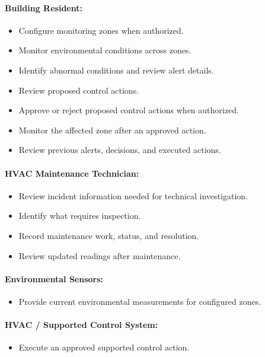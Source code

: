 \documentclass[11pt,a4paper]{article}
\begin{document}
\paragraph{Building Resident:}\leavevmode
\begin{itemize}[label=\cbox,itemsep=1pt]
\item Configure monitoring zones when authorized.
\item Monitor environmental conditions across zones.
\item Identify abnormal conditions and review alert details.
\item Review proposed control actions.
\item Approve or reject proposed control actions when authorized.
\item Monitor the affected zone after an approved action.
\item Review previous alerts, decisions, and executed actions.
\end{itemize}

\paragraph{HVAC Maintenance Technician:}\leavevmode
\begin{itemize}[label=\cbox,itemsep=1pt]
\item Review incident information needed for technical investigation.
\item Identify what requires inspection.
\item Record maintenance work, status, and resolution.
\item Review updated readings after maintenance.
\end{itemize}

\paragraph{Environmental Sensors:}\leavevmode
\begin{itemize}[label=\cbox]
\item Provide current environmental measurements for configured zones.
\end{itemize}

\paragraph{HVAC / Supported Control System:}\leavevmode
\begin{itemize}[label=\cbox]
\item Execute an approved supported control action.
\end{itemize}
\end{document}
